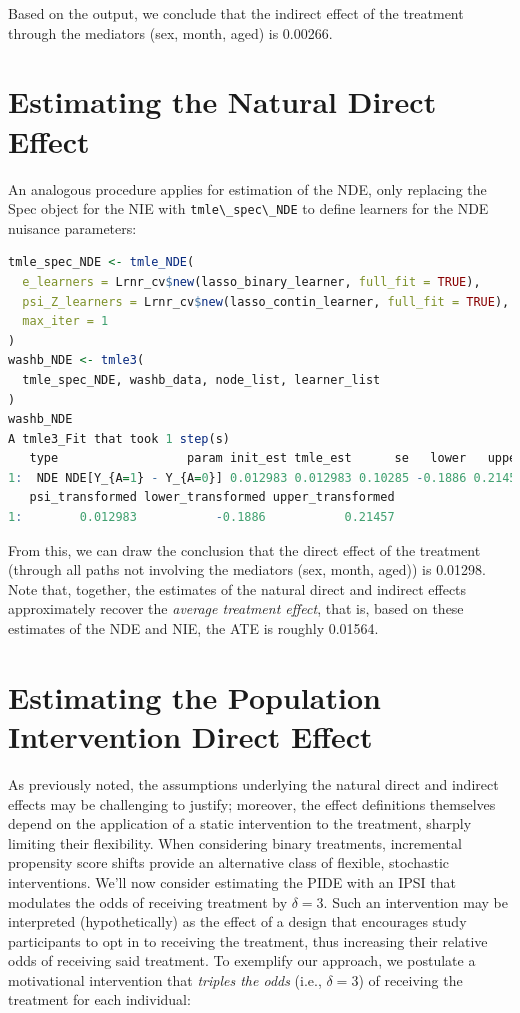 \documentclass[
  12pt, krantz2,
]{krantz}
\newcommand{\passthrough}[1]{#1}
\theoremstyle{definition}
\theoremstyle{definition}
\theoremstyle{definition}
\newcommand{\1}{\mathbbm{1}}
\begin{document}
Based on the output, we conclude that the indirect effect of the treatment
through the mediators (sex, month, aged) is
0.00266.

\hypertarget{estimating-the-natural-direct-effect}{%
\section{Estimating the Natural Direct Effect}\label{estimating-the-natural-direct-effect}}

An analogous procedure applies for estimation of the NDE, only replacing the
Spec object for the NIE with \passthrough{\lstinline!tmle\_spec\_NDE!} to define learners for the NDE
nuisance parameters:

\begin{lstlisting}[language=R]
tmle_spec_NDE <- tmle_NDE(
  e_learners = Lrnr_cv$new(lasso_binary_learner, full_fit = TRUE),
  psi_Z_learners = Lrnr_cv$new(lasso_contin_learner, full_fit = TRUE),
  max_iter = 1
)
washb_NDE <- tmle3(
  tmle_spec_NDE, washb_data, node_list, learner_list
)
washb_NDE
A tmle3_Fit that took 1 step(s)
   type                  param init_est tmle_est      se   lower   upper
1:  NDE NDE[Y_{A=1} - Y_{A=0}] 0.012983 0.012983 0.10285 -0.1886 0.21457
   psi_transformed lower_transformed upper_transformed
1:        0.012983           -0.1886           0.21457
\end{lstlisting}

From this, we can draw the conclusion that the direct effect of the treatment
(through all paths not involving the mediators (sex, month, aged)) is
0.01298. Note that, together, the estimates of
the natural direct and indirect effects approximately recover the \emph{average
treatment effect}, that is, based on these estimates of the NDE and NIE, the
ATE is roughly
0.01564.

\hypertarget{estimating-the-population-intervention-direct-effect}{%
\section{Estimating the Population Intervention Direct Effect}\label{estimating-the-population-intervention-direct-effect}}

As previously noted, the assumptions underlying the natural direct and indirect
effects may be challenging to justify; moreover, the effect definitions
themselves depend on the application of a static intervention to the treatment,
sharply limiting their flexibility. When considering binary treatments,
incremental propensity score shifts provide an alternative class of flexible,
stochastic interventions. We'll now consider estimating the PIDE with an IPSI
that modulates the odds of receiving treatment by \(\delta = 3\). Such an
intervention may be interpreted (hypothetically) as the effect of a design that
encourages study participants to opt in to receiving the treatment, thus
increasing their relative odds of receiving said treatment. To exemplify our
approach, we postulate a motivational intervention that \emph{triples the odds}
(i.e., \(\delta = 3\)) of receiving the treatment for each individual:
\end{document}
